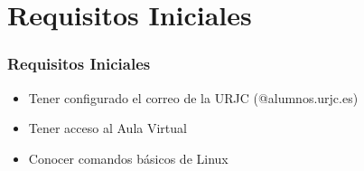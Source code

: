 \section{Requisitos Iniciales}

\begin{frame}
\frametitle{Requisitos Iniciales}

\begin{itemize}
	\item Tener configurado el correo de la URJC (@alumnos.urjc.es)
	\item Tener acceso al Aula Virtual
	\item Conocer comandos básicos de Linux
\end{itemize}

\end{frame}

